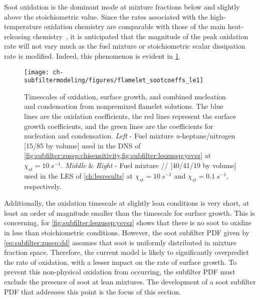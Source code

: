 Soot oxidation is the dominant mode at mixture fractions below and slightly above the stoichiometric value. Since the rates associated with the high-temperature oxidation chemistry are comparable with those of the main heat-releasing chemistry~\cite{guo2016}, it is anticipated that the magnitude of the peak oxidation rate will not vary much as the fuel mixture or stoichiometric scalar dissipation rate is modified. Indeed, this phenomenon is evident in \cref{fig:subfilter:leszussp:kvsz}.

\begin{figure}[htb]
  \centering
  \texttt{[image: ch-subfiltermodeling/figures/flamelet\_sootcoeffs\_le1]}
  \caption[Soot Growth and Oxidation Timescales, 1/\texorpdfstring{$\tau$}{t} vs. \texorpdfstring{$Z$}{Z}]{Timescales of oxidation, surface growth, and combined nucleation and condensation from nonpremixed flamelet solutions. The blue lines are the oxidation coefficients, the red lines represent the surface growth coefficients, and the green lines are the coefficients for nucleation and condensation. \textit{Left} - Fuel mixture \textit{n}-heptane/nitrogen [15/85 by volume] used in the DNS of \cref{fig:subfilter:zussp:chisensitivity,fig:subfilter:leszussp:ysvsz} at $\chi_{st} = 10\ s^{-1}$. \textit{Middle} \& \textit{Right} - Fuel mixture // [40/41/19 by volume] used in the LES of \cref{ch:lesresults} at $\chi_{st} = 10\ s^{-1}$ and $\chi_{st} = 0.1\ s^{-1}$, respectively.}
  \label{fig:subfilter:leszussp:kvsz}
\end{figure}

Additionally, the oxidation timescale at slightly lean conditions is very short, at least an order of magnitude smaller than the timescale for surface growth. This is concerning, for \cref{fig:subfilter:leszussp:ysvsz} shows that there is no soot to oxidize in less than stoichiometric conditions. However, the soot subfilter PDF given by \cref{eq:subfilter:zussp:dd} assumes that soot is uniformly distributed in mixture fraction space. Therefore, the current model is likely to significantly overpredict the rate of oxidation, with a lesser impact on the rate of surface growth. To prevent this non-physical oxidation from occurring, the subfilter PDF must exclude the presence of soot at lean mixtures. The development of a soot subfilter PDF that addresses this point is the focus of this section.

